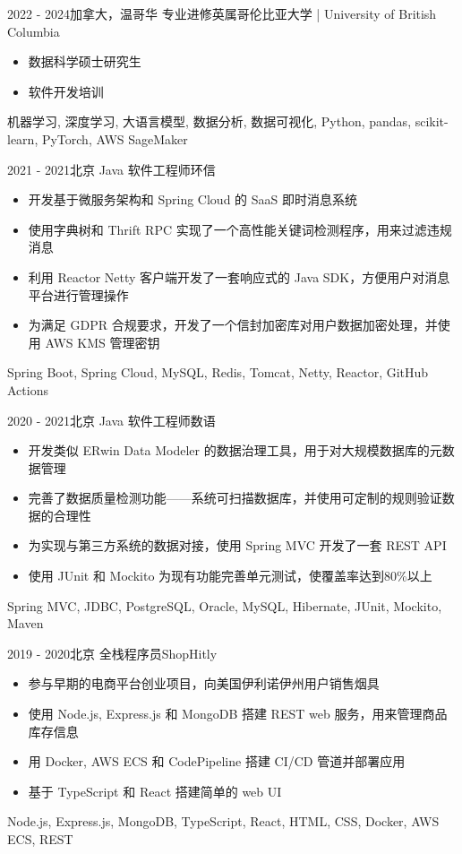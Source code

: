 \begin{experiences}

\experience
{2022 - 2024}{加拿大，温哥华}
{专业进修}{英属哥伦比亚大学 | University of British Columbia}
{
    \begin{itemize}
    \item 数据科学硕士研究生
    \item 软件开发培训
    \end{itemize}
}
{机器学习, 深度学习, 大语言模型, 数据分析, 数据可视化, Python, pandas, scikit-learn, PyTorch, AWS SageMaker}

\experience
{2021 - 2021}{北京}
{Java 软件工程师}{环信}
{
    \begin{itemize}
    \item 开发基于微服务架构和 Spring Cloud 的 SaaS 即时消息系统
    \item 使用字典树和 Thrift RPC 实现了一个高性能关键词检测程序，用来过滤违规消息
    \item 利用 Reactor Netty 客户端开发了一套响应式的 Java SDK，方便用户对消息平台进行管理操作
    \item 为满足 GDPR 合规要求，开发了一个信封加密库对用户数据加密处理，并使用 AWS KMS 管理密钥
    \end{itemize}
}
{Spring Boot, Spring Cloud, MySQL, Redis, Tomcat, Netty, Reactor, GitHub Actions}

\experience
{2020 - 2021}{北京}
{Java 软件工程师}{数语}
{
    \begin{itemize}
    \item 开发类似 ERwin Data Modeler 的数据治理工具，用于对大规模数据库的元数据管理
    \item 完善了数据质量检测功能——系统可扫描数据库，并使用可定制的规则验证数据的合理性
    \item 为实现与第三方系统的数据对接，使用 Spring MVC 开发了一套 REST API
    \item 使用 JUnit 和 Mockito 为现有功能完善单元测试，使覆盖率达到80\%以上
    \end{itemize}
}
{Spring MVC, JDBC, PostgreSQL, Oracle, MySQL, Hibernate, JUnit, Mockito, Maven}

\experience
{2019 - 2020}{北京}
{全栈程序员}{ShopHitly}
{
    \begin{itemize}
    \item 参与早期的电商平台创业项目，向美国伊利诺伊州用户销售烟具
    \item 使用 Node.js, Express.js 和 MongoDB 搭建 REST web 服务，用来管理商品库存信息
    \item 用 Docker, AWS ECS 和 CodePipeline 搭建 CI/CD 管道并部署应用
    \item 基于 TypeScript 和 React 搭建简单的 web UI
    \end{itemize}
}
{Node.js, Express.js, MongoDB, TypeScript, React, HTML, CSS, Docker, AWS ECS, REST}


\end{experiences}
